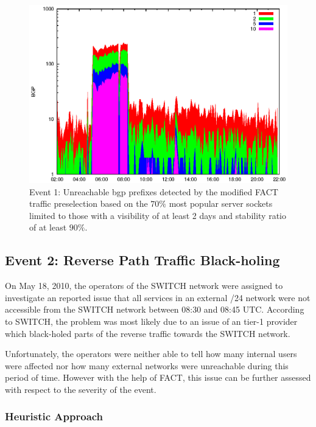 \begin{figure}
	[p] \centering 
	\includegraphics[width=0.75\linewidth]{images/events/2010_03_25/bgp_log_Set_var_0_1_stab_9_vts_2.eps} \caption{Event 1: Unreachable \gls{bgp} prefixes detected by the modified \gls{FACT} traffic preselection based on the $70\%$ most popular \glspl{server socket} limited to those with a visibility of at least 2 days and stability ratio of at least $90\%$.} 
	\label{fig:AMS_IX_FACT_popularVTS2STAB9} 
\end{figure}

\newpage 
\subsection{Event 2: Reverse Path Traffic Black-holing}

On May 18, 2010, the operators of the SWITCH network were assigned to investigate an reported issue that all services in an external /24 network were not accessible from the SWITCH network between 08:30 and 08:45 UTC. 
According to SWITCH, the problem was most likely due to an issue of an tier-1 provider which black-holed parts of the reverse traffic towards the SWITCH network\citep{SchatzmannPAM2011}.

Unfortunately, the operators were neither able to tell how many internal users were affected nor how many external networks were unreachable during this period of time. 
However with the help of \gls{FACT}, this issue can be further assessed with respect to the severity of the event\citep{SchatzmannPAM2011}.

\subsubsection{Heuristic Approach}

